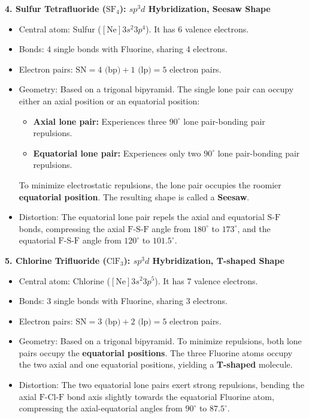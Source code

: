 \documentclass[12pt,a4paper]{article}
\begin{document}
\textbf{4. Sulfur Tetrafluoride ($\text{SF}_4$): $sp^3d$ Hybridization, Seesaw Shape}
\begin{itemize}[leftmargin=*, itemsep=1pt]
  \item Central atom: Sulfur ($[\text{Ne}]3s^2 3p^4$). It has 6 valence electrons.
  \item Bonds: 4 single bonds with Fluorine, sharing 4 electrons.
  \item Electron pairs: $\text{SN} = 4\text{ (bp)} + 1\text{ (lp)} = 5$ electron pairs.
  \item Geometry: Based on a trigonal bipyramid. The single lone pair can occupy either an axial position or an equatorial position:
    \begin{itemize}
      \item \textbf{Axial lone pair:} Experiences three $90^\circ$ lone pair-bonding pair repulsions.
      \item \textbf{Equatorial lone pair:} Experiences only two $90^\circ$ lone pair-bonding pair repulsions.
    \end{itemize}
    To minimize electrostatic repulsions, the lone pair occupies the roomier \textbf{equatorial position}. The resulting shape is called a \textbf{Seesaw}.
  \item Distortion: The equatorial lone pair repels the axial and equatorial $\text{S-F}$ bonds, compressing the axial $\text{F-S-F}$ angle from $180^\circ$ to $173^\circ$, and the equatorial $\text{F-S-F}$ angle from $120^\circ$ to $101.5^\circ$.
\end{itemize}

\textbf{5. Chlorine Trifluoride ($\text{ClF}_3$): $sp^3d$ Hybridization, T-shaped Shape}
\begin{itemize}[leftmargin=*, itemsep=1pt]
  \item Central atom: Chlorine ($[\text{Ne}]3s^2 3p^5$). It has 7 valence electrons.
  \item Bonds: 3 single bonds with Fluorine, sharing 3 electrons.
  \item Electron pairs: $\text{SN} = 3\text{ (bp)} + 2\text{ (lp)} = 5$ electron pairs.
  \item Geometry: Based on a trigonal bipyramid. To minimize repulsions, both lone pairs occupy the \textbf{equatorial positions}. The three Fluorine atoms occupy the two axial and one equatorial positions, yielding a \textbf{T-shaped} molecule.
  \item Distortion: The two equatorial lone pairs exert strong repulsions, bending the axial $\text{F-Cl-F}$ bond axis slightly towards the equatorial Fluorine atom, compressing the axial-equatorial angles from $90^\circ$ to $87.5^\circ$.
\end{itemize}
\end{document}
